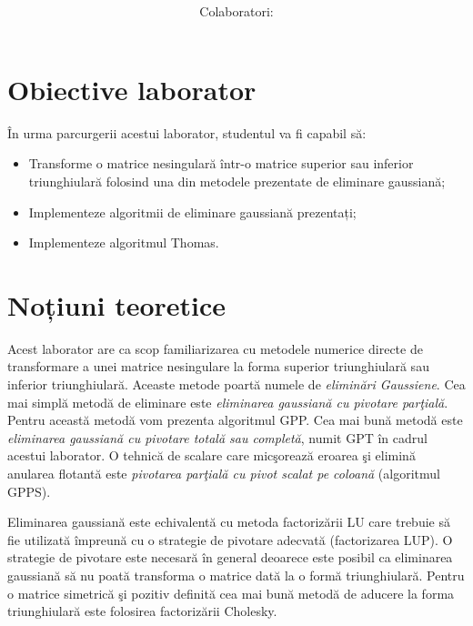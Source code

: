 \documentclass{exam}
\title{
	\textmd{\textbf{\MNLabTitle}}
	\author{Colaboratori: \MNAuthor}
}
\begin{document}
\begin{coverpages}

	\maketitle
	\tableofcontents

\end{coverpages}

\section{Obiective laborator}

\par În urma parcurgerii acestui laborator, studentul va fi capabil să:
\begin{itemize}
	\item Transforme o matrice nesingulară într-o matrice superior sau inferior triunghiulară folosind una din metodele prezentate de eliminare gaussiană;
	\item Implementeze algoritmii de eliminare gaussiană prezentați;
	\item Implementeze algoritmul Thomas.
\end{itemize}

\section{Noțiuni teoretice}

Acest laborator are ca scop familiarizarea cu metodele numerice directe de transformare a unei matrice nesingulare la forma superior triunghiular\u{a} sau inferior triunghiular\u{a}. Aceaste metode poart\u{a} numele de \textit{elimin\u{a}ri Gaussiene}. Cea mai simpl\u{a} metod\u{a} de eliminare este \textit{eliminarea gaussian\u{a} cu pivotare par\c{t}ial\u{a}}. Pentru aceast\u{a} metod\u{a} vom prezenta algoritmul GPP. Cea mai bun\u{a} metod\u{a} este \textit{eliminarea gaussian\u{a} cu pivotare total\u{a} sau complet\u{a}}, numit GPT \^{i}n cadrul acestui laborator. O tehnic\u{a} de scalare care mic\c{s}oreaz\u{a} eroarea \c{s}i elimin\u{a} anularea flotant\u{a} este \textit{pivotarea par\c{t}ial\u{a} cu pivot scalat pe coloan\u{a}} (algoritmul GPPS).

Eliminarea gaussian\u{a} este echivalent\u{a} cu metoda factoriz\u{a}rii LU care trebuie s\u{a} fie utilizat\u{a} \^{i}mpreun\u{a} cu o strategie de pivotare adecvat\u{a} (factorizarea LUP). O strategie de pivotare este necesar\u{a} \^in general deoarece este posibil ca eliminarea gaussian\u{a} s\u{a} nu poat\u{a} transforma o matrice dat\u{a} la o form\u{a} triunghiular\u{a}. Pentru o matrice simetric\u{a} \c{s}i pozitiv definit\u{a} cea mai bun\u{a} metod\u{a} de aducere la forma triunghiular\u{a} este folosirea factoriz\u{a}rii Cholesky.
\end{document}
